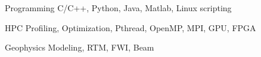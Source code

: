 \documentclass[11pt, a4paper]{awesome-cv}
\begin{document}


\begin{cvskills}

  \cvskill
    {Programming} %
    {C/C++, Python, Java, Matlab, Linux scripting} %

  \cvskill
    {HPC} %
    {Profiling, Optimization, Pthread, OpenMP, MPI, GPU, FPGA} %

  \cvskill
    {Geophysics} %
    {Modeling, RTM, FWI, Beam} %

\end{cvskills}




\end{document}
